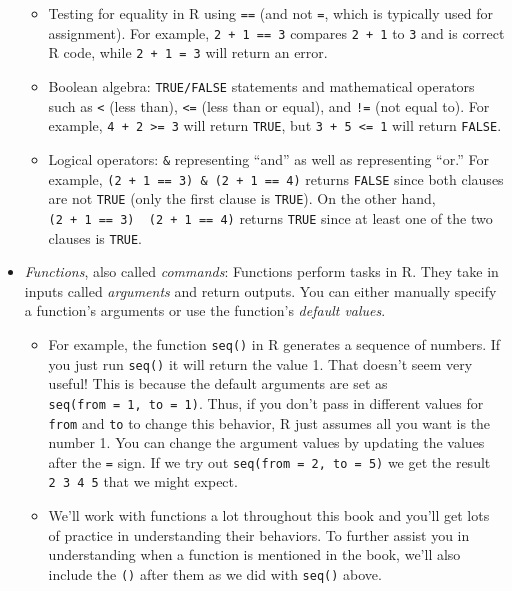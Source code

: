 \documentclass[]{book}
\providecommand{\tightlist}{%
  \setlength{\itemsep}{0pt}\setlength{\parskip}{0pt}}
\begin{document}
\begin{itemize}
  \begin{itemize}
  \tightlist
  \item
    Testing for equality in R using \texttt{==} (and not \texttt{=}, which is typically used for assignment). For example, \texttt{2\ +\ 1\ ==\ 3} compares \texttt{2\ +\ 1} to \texttt{3} and is correct R code, while \texttt{2\ +\ 1\ =\ 3} will return an error.
  \item
    Boolean algebra: \texttt{TRUE/FALSE} statements and mathematical operators such as \texttt{\textless{}} (less than), \texttt{\textless{}=} (less than or equal), and \texttt{!=} (not equal to).  For example, \texttt{4\ +\ 2\ \textgreater{}=\ 3} will return \texttt{TRUE}, but \texttt{3\ +\ 5\ \textless{}=\ 1} will return \texttt{FALSE}.
  \item
    Logical operators: \texttt{\&} representing ``and'' as well as \texttt{\textbar{}} representing ``or.'' For example, \texttt{(2\ +\ 1\ ==\ 3)\ \&\ (2\ +\ 1\ ==\ 4)} returns \texttt{FALSE} since both clauses are not \texttt{TRUE} (only the first clause is \texttt{TRUE}). On the other hand, \texttt{(2\ +\ 1\ ==\ 3)\ \textbar{}\ (2\ +\ 1\ ==\ 4)} returns \texttt{TRUE} since at least one of the two clauses is \texttt{TRUE}. 
  \end{itemize}
\item
  \emph{Functions}, also called \emph{commands}: Functions perform tasks in R. They take in inputs called \emph{arguments} and return outputs. You can either manually specify a function's arguments or use the function's \emph{default values}. 

  \begin{itemize}
  \tightlist
  \item
    For example, the function \texttt{seq()} in R generates a sequence of numbers. If you just run \texttt{seq()} it will return the value 1. That doesn't seem very useful! This is because the default arguments are set as \texttt{seq(from\ =\ 1,\ to\ =\ 1)}. Thus, if you don't pass in different values for \texttt{from} and \texttt{to} to change this behavior, R just assumes all you want is the number 1. You can change the argument values by updating the values after the \texttt{=} sign. If we try out \texttt{seq(from\ =\ 2,\ to\ =\ 5)} we get the result \texttt{2\ 3\ 4\ 5} that we might expect.
  \item
    We'll work with functions a lot throughout this book and you'll get lots of practice in understanding their behaviors. To further assist you in understanding when a function is mentioned in the book, we'll also include the \texttt{()} after them as we did with \texttt{seq()} above.
  \end{itemize}
\end{itemize}
\end{document}
